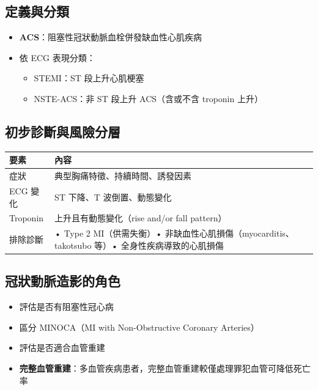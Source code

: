 \documentclass[12pt,a4paper]{article}
\begin{document}
\subsection{定義與分類}

\begin{itemize}
    \item \textbf{ACS}：阻塞性冠狀動脈血栓併發缺血性心肌疾病
    \item 依 ECG 表現分類：
    \begin{itemize}
        \item STEMI：ST 段上升心肌梗塞
        \item NSTE-ACS：非 ST 段上升 ACS（含或不含 troponin 上升）
    \end{itemize}
\end{itemize}

\subsection{初步診斷與風險分層}

\begin{longtable}{p{3cm}p{11cm}}
\toprule
\textbf{要素} & \textbf{內容} \\
\midrule
\endfirsthead
\bottomrule
\endfoot
症狀 & 典型胸痛特徵、持續時間、誘發因素 \\
\midrule
ECG 變化 & ST 下降、T 波倒置、動態變化 \\
\midrule
Troponin & 上升且有動態變化（rise and/or fall pattern）\\
\midrule
排除診斷 & • Type 2 MI（供需失衡）\newline • 非缺血性心肌損傷（myocarditis、takotsubo 等）\newline • 全身性疾病導致的心肌損傷 \\
\bottomrule
\end{longtable}

\subsection{冠狀動脈造影的角色}

\begin{itemize}
    \item 評估是否有阻塞性冠心病
    \item 區分 MINOCA（MI with Non-Obstructive Coronary Arteries）
    \item 評估是否適合血管重建
    \item \textbf{完整血管重建}：多血管疾病患者，完整血管重建較僅處理罪犯血管可降低死亡率
\end{itemize}
\end{document}
